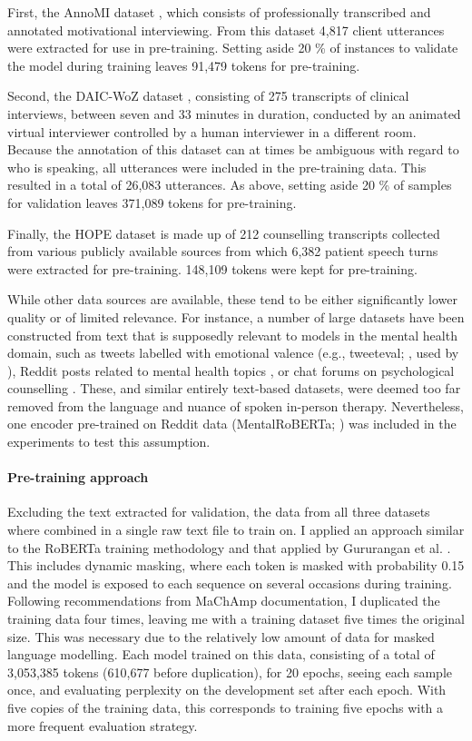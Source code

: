 \documentclass[12pt]{report}
\begin{document}
First, the AnnoMI dataset \cite{Wu2022}, which consists of professionally transcribed and annotated motivational interviewing.
From this dataset 4,817 client utterances were extracted for use in pre-training.
Setting aside 20 \% of instances to validate the model during training leaves 91,479 tokens for pre-training.

Second, the DAIC-WoZ dataset \cite{Gratch2014}, consisting of 275 transcripts of clinical interviews, between seven and 33 minutes in duration, conducted by an animated virtual interviewer controlled by a human interviewer in a different room.
Because the annotation of this dataset can at times be ambiguous with regard to who is speaking, all utterances were included in the pre-training data.
This resulted in a total of 26,083 utterances. As above, setting aside 20 \% of samples for validation leaves 371,089 tokens for pre-training.

Finally, the HOPE dataset  is made up of 212 counselling transcripts collected from various publicly available sources from which 6,382 patient speech turns were extracted for pre-training.
148,109 tokens were kept for pre-training.

While other data sources are available, these tend to be either significantly lower quality or of limited relevance.
For instance, a number of large datasets have been constructed from text that is supposedly relevant to models in the mental health domain, such as tweets labelled with emotional valence (e.g., tweeteval; , used by ), Reddit posts related to mental health topics , or chat forums on psychological counselling \cite{counselchat}.
These, and similar entirely text-based datasets, were deemed too far removed from the language and nuance of spoken in-person therapy.
Nevertheless, one encoder pre-trained on Reddit data (MentalRoBERTa; ) was included in the experiments to test this assumption.

\paragraph*{Pre-training approach}
Excluding the text extracted for validation, the data from all three datasets where combined in a single raw text file to train on.
I applied an approach similar to the RoBERTa training methodology and that applied by Gururangan et al. \citeyear{Gururangan2020}.
This includes dynamic masking, where each token is masked with probability 0.15 and the model is exposed to each sequence on several occasions during training.
Following recommendations from MaChAmp documentation, I duplicated the training data four times, leaving me with a training dataset five times the original size.
This was necessary due to the relatively low amount of data for masked language modelling.
Each model trained on this data, consisting of a total of 3,053,385 tokens (610,677 before duplication), for 20 epochs, seeing each sample once, and evaluating perplexity on the development set after each epoch.
With five copies of the training data, this corresponds to training five epochs with a more frequent evaluation strategy.
\end{document}
